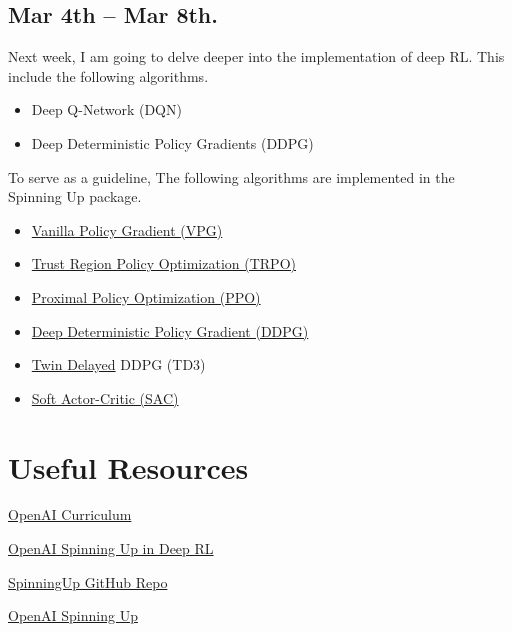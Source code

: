 \subsection{Mar 4th -- Mar 8th.}  

Next week, I am going to delve deeper into the implementation of deep RL. This include the following algorithms.
\begin{itemize}
	\item Deep Q-Network (DQN)
	\item Deep Deterministic Policy Gradients (DDPG)
\end{itemize}

To serve as a guideline, The following algorithms are implemented in the Spinning Up package. 

\begin{itemize}
	\item \href{https://spinningup.openai.com/en/latest/algorithms/vpg.html}{Vanilla Policy Gradient (VPG)}
	\item \href{https://spinningup.openai.com/en/latest/algorithms/trpo.html}{Trust Region Policy Optimization (TRPO)}
	\item \href{https://spinningup.openai.com/en/latest/algorithms/ppo.html}{Proximal Policy Optimization (PPO)}
	\item \href{https://spinningup.openai.com/en/latest/algorithms/ddpg.html}{Deep Deterministic Policy Gradient (DDPG)}
	\item \href{https://spinningup.openai.com/en/latest/algorithms/td3.html}{Twin Delayed} DDPG (TD3)
	\item \href{https://spinningup.openai.com/en/latest/algorithms/sac.html}{Soft Actor-Critic (SAC)}
\end{itemize}


\section{Useful Resources}

\href{https://github.com/openai/curriculum}{OpenAI Curriculum}

\href{https://spinningup.openai.com/en/latest/}{OpenAI Spinning Up in Deep RL}

\href{https://github.com/openai/spinningup}{SpinningUp GitHub Repo}

\href{https://spinningup.openai.com/en/latest/}{OpenAI Spinning Up}



